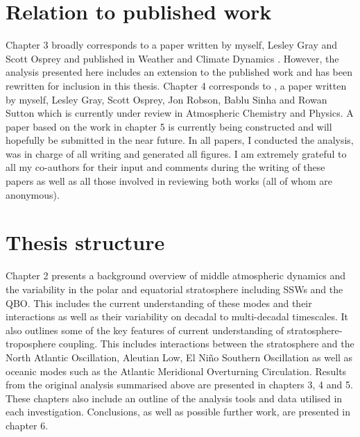 \section{Relation to published work}

Chapter 3 broadly corresponds to a paper written by myself, Lesley Gray and Scott Osprey and published in Weather and Climate Dynamics \citep{dimdore-milesOrigins2021}. However, the analysis presented here includes an extension to the published work and has been rewritten for inclusion in this thesis. Chapter 4 corresponds to \cite{dimdore-milesInteractions2021}, a paper written by myself, Lesley Gray, Scott Osprey, Jon Robson, Bablu Sinha and Rowan Sutton which is currently under review in Atmospheric Chemistry and Physics. A paper based on the work in chapter 5 is currently being constructed and will hopefully be submitted in the near future. 
In all papers, I conducted the analysis, was in charge of all writing and generated all figures. I am extremely grateful to all my co-authors for their input and comments during the writing of these papers as well as all those involved in reviewing both works (all of whom are anonymous).  

\section{Thesis structure}
Chapter 2 presents a background overview of middle atmospheric dynamics and the variability in the polar and equatorial stratosphere including SSWs and the QBO. This includes the current understanding of these modes and their interactions as well as their variability on decadal to multi-decadal timescales. It also outlines some of the key features of current understanding of stratosphere-troposphere coupling. This includes interactions between the stratosphere and the North Atlantic Oscillation, Aleutian Low, El Ni\~{n}o Southern Oscillation as well as oceanic modes such as the Atlantic Meridional Overturning Circulation. Results from the original analysis summarised above are presented in chapters 3, 4 and 5. These chapters also include an outline of the analysis tools and data utilised in each investigation. Conclusions, as well as possible further work, are presented in chapter 6.








